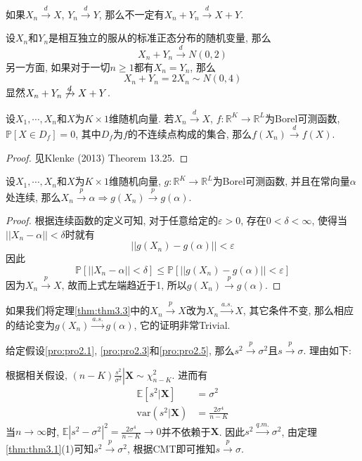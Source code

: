\documentclass[cn, 12pt, math=mtpro2, bibstyle=apa, blue, twocol]{elegantbook}
\newcommand{\R}{\mathbb{R}}
\newcommand{\E}{\mathbb{E}}
\newcommand{\PP}{\mathbb{P}}
\newcommand{\var}{\text{var}}
\begin{document}
\begin{remark}
如果$X_n\xrightarrow{d}X$, $Y_n\xrightarrow{d}Y$, 那么不一定有$X_n+Y_n\xrightarrow{d}X+Y$.
\end{remark}
\begin{example}
设$X_n$和$Y_n$是相互独立的服从的标准正态分布的随机变量, 那么
$$X_n+Y_n\xrightarrow{d}N(0,2)$$
另一方面, 如果对于一切$n\ge1$都有$X_n=Y_n$, 那么
$$X_n+Y_n=2X_n\sim N(0,4)$$
显然$X_n+Y_n\not\xrightarrow{d}X+Y$.
\end{example}
\begin{theorem}[连续映射定理]
  设$X_1,\cdots,X_n$和$X$为$K\times1$维随机向量. 若$X_n\xrightarrow{d}X$, $f:\R^K\to\R^L$为Borel可测函数, $\PP[X\in D_f]=0$, 其中$D_f$为$f$的不连续点构成的集合, 那么$f(X_n)\xrightarrow{d}f(X)$.
\end{theorem}
\begin{proof}
  见Klenke (2013) Theorem 13.25.
\end{proof}
\begin{theorem}[连续映射定理]\label{thm:thm3.3}
  设$X_1,\cdots,X_n$和$X$为$K\times1$维随机向量, $g:\R^K\to\R^L$为Borel可测函数, 并且在常向量$\alpha$处连续, 那么$X_n\xrightarrow{p}\alpha\Rightarrow g(X_n)\xrightarrow{p}g(\alpha)$.
\end{theorem}
\begin{proof}
  根据连续函数的定义可知, 对于任意给定的$\varepsilon>0$, 存在$0<\delta<\infty$, 使得当$||X_n-\alpha||<\delta$时就有
  $$||g(X_n)-g(\alpha)||<\varepsilon$$
  因此
  $$\PP[||X_n-\alpha||<\delta]\leq\PP[||g(X_n)-g(\alpha)||<\varepsilon]$$
  因为$X_n\xrightarrow{p}X$, 故而上式左端趋近于1, 所以$g(X_n)\xrightarrow{p}g(\alpha)$.
\end{proof}
\begin{remark}
如果我们将定理\ref{thm:thm3.3}中的$X_n\xrightarrow{p}X$改为$X_n\xrightarrow{a.s.}X$, 其它条件不变, 那么相应的结论变为$g(X_n)\xrightarrow{a.s.}g(\alpha)$, 它的证明非常Trivial.
\end{remark}
\begin{example}
给定假设\ref{pro:pro2.1}, \ref{pro:pro2.3}和\ref{pro:pro2.5}, 那么$s^2\xrightarrow{p}\sigma^2$且$s\xrightarrow{p}\sigma$. 理由如下:

根据相关假设, $\displaystyle(n-K)\left.\frac{s^2}{\sigma^2}\right|\mathbold{X}\sim\chi^2_{n-K}$. 进而有
  \begin{align*}
  \E[s^2|\mathbold{X}]&=\sigma^2 \\
  \var(s^2|\mathbold{X})&=\frac{2\sigma^4}{n-K}
  \end{align*}
  当$n\rightarrow\infty$时, $\displaystyle\E|s^2-\sigma^2|^2=\frac{2\sigma^4}{n-K}\rightarrow 0$并不依赖于$\mathbold{X}$. 因此$s^2\xrightarrow{q.m.}\sigma^2$, 由定理\ref{thm:thm3.1}(1)可知$s^2\xrightarrow{p}\sigma^2$, 根据CMT即可推知$s\xrightarrow{p}\sigma$.
\end{example}
\end{document}
